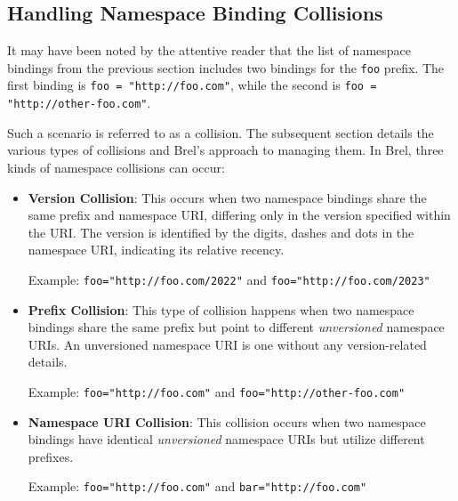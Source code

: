 

\subsection{Handling Namespace Binding Collisions}

It may have been noted by the attentive reader that the list of namespace bindings from the previous section includes two bindings for the \texttt{foo} prefix.
The first binding is \texttt{foo = "http://foo.com"}, while the second is \texttt{foo = "http://other-foo.com"}.

Such a scenario is referred to as a collision.
The subsequent section details the various types of collisions and Brel's approach to managing them.
In Brel, three kinds of namespace collisions can occur:

\begin{itemize}
\item \textbf{Version Collision}: This occurs when two namespace bindings share the same prefix and namespace URI, differing only in the version specified within the URI.
The version is identified by the digits, dashes and dots in the namespace URI, indicating its relative recency.

Example: \texttt{foo="http://foo.com/2022"} and \texttt{foo="http://foo.com/2023"}
\item \textbf{Prefix Collision}: This type of collision happens when two namespace bindings share the same prefix but point to different \textit{unversioned} namespace URIs.
An unversioned namespace URI is one without any version-related details.

Example: \texttt{foo="http://foo.com"} and \texttt{foo="http://other-foo.com"}
\item \textbf{Namespace URI Collision}: This collision occurs when two namespace bindings have identical \textit{unversioned} namespace URIs but utilize different prefixes.

Example: \texttt{foo="http://foo.com"} and \texttt{bar="http://foo.com"}
\end{itemize}

